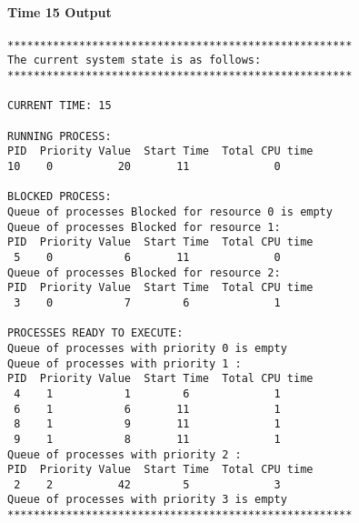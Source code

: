 \paragraph*{Time 15 Output}
\indent \fontsize{10}{9.7}\selectfont \begin{verbatim}
*****************************************************
The current system state is as follows:
*****************************************************

CURRENT TIME: 15

RUNNING PROCESS:
PID  Priority Value  Start Time  Total CPU time
10    0          20       11             0

BLOCKED PROCESS:
Queue of processes Blocked for resource 0 is empty
Queue of processes Blocked for resource 1:
PID  Priority Value  Start Time  Total CPU time
 5    0           6       11             0
Queue of processes Blocked for resource 2:
PID  Priority Value  Start Time  Total CPU time
 3    0           7        6             1

PROCESSES READY TO EXECUTE:
Queue of processes with priority 0 is empty
Queue of processes with priority 1 :
PID  Priority Value  Start Time  Total CPU time
 4    1           1        6             1
 6    1           6       11             1
 8    1           9       11             1
 9    1           8       11             1
Queue of processes with priority 2 :
PID  Priority Value  Start Time  Total CPU time
 2    2          42        5             3
Queue of processes with priority 3 is empty
*****************************************************
\end{verbatim}
\newpage
